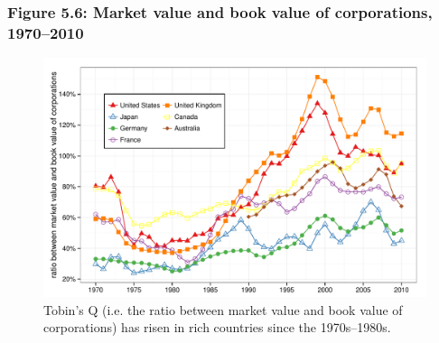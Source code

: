 \documentclass[t]{beamer}\usepackage[]{graphicx}\usepackage[]{color}
\newenvironment{knitrout}{}{} %
\begin{document}
\begin{frame}[label=Figure_5_6]
\frametitle{Figure 5.6: Market value and book value of corporations, 1970--2010}
\begin{figure}[t]
\begin{minipage}[b]{\textwidth}
\centering
\begin{knitrout}\footnotesize
{}\color{fgcolor}

{\centering \includegraphics[width=1\linewidth]{figures/color/Figure_5_6} 

}



\end{knitrout}
\caption{Tobin's Q (i.e. the ratio between market value and book value of corporations) has risen in rich countries since the 1970s--1980s.}
\end{minipage}
\end{figure}
\end{frame}
\end{document}
